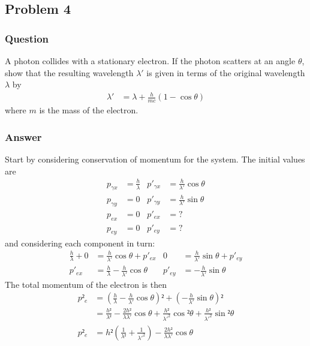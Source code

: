 \clearpage
\subsection{Problem 4}
\subsubsection{Question}
A photon collides with a stationary electron. If the photon scatters at an
angle $θ$, show that the resulting wavelength $λ'$ is given in terms of the
original wavelength $λ$ by
\begin{align*}
	λ' &= λ + \frac{h}{mc} (1 - \cos θ)
\end{align*}
where $m$ is the mass of the electron.

\subsubsection{Answer}
Start by considering conservation of momentum for the system. The initial values
are
\begin{align*}
	p_{γx} &= \frac{h}{λ}		&		p'_{γx} &= \frac{h}{λ'} \cos θ \\
	p_{γy} &= 0					&		p'_{γy} &= \frac{h}{λ'} \sin θ \\
	p_{ex} &= 0					&		p'_{ex} &= ? \\
	p_{ey} &= 0					&		p'_{ey} &= ?
\end{align*}
and considering each component in turn:
\begin{align*}
	\frac{h}{λ} + 0 &= \frac{h}{λ'}\cos θ + p'_{ex}
		& 0 &= \frac{h}{λ'}\sin θ + p'_{ey}
	\\
	p'_{ex} &= \frac{h}{λ} - \frac{h}{λ'}\cos θ
		& p'_{ey} &= -\frac{h}{λ'}\sin θ
\end{align*}
The total momentum of the electron is then
\begin{align}
	p²_e &= \left( \frac{h}{λ} - \frac{h}{λ'}\cos θ \right)² +
		\left( -\frac{h}{λ'}\sin θ \right)²
		\nonumber
	\\
	{} &= \frac{h²}{λ²} - \frac{2h²}{λλ'}\cos θ + \frac{h²}{λ'^2}\cos ²θ +
		\frac{h²}{λ'^2}\sin ²θ
		\nonumber
	\\
	p²_e &= h² \left( \frac{1}{λ²} + \frac{1}{λ'^2} \right) -
		\frac{2h²}{λλ'}\cos θ
\end{align}

